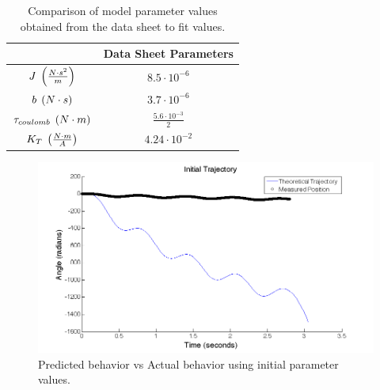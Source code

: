 \documentclass{article}
\theoremstyle{plain}
\theoremstyle{definition}
\theoremstyle{remark}
\begin{document}
\begin{table}
\begin{center}
    \begin{tabular}{|c|c|}
        \hline
        ~                                                      & Data Sheet Parameters        \\ \hline
        $J \hspace{0.1cm} \left( \frac{N\cdot s^2}{m} \right)$     & $8.5 \cdot 10^{-6} $               \\ 
        $b \hspace{0.1cm} \left( N \cdot s \right) $               & $3.7\cdot 10^{-6} $                 \\ 
        $\tau_{coulomb} \hspace{0.1cm} \left( N \cdot m \right)$           & $\frac{5.6 \cdot 10^{-3}}{2} $  \\ 
        $K_{T} \hspace{0.1cm} \left( \frac{N\cdot m}{A} \right) $ & $4.24 \cdot 10^{-2}$             \\
        \hline
    \end{tabular}
\caption{Comparison of model parameter values obtained from the data sheet to fit values.}
\label{q2_b1}
\end{center}
\end{table}

\begin{figure}
\begin{center}
\includegraphics[width = 14cm]{initialModel.png}
\caption{Predicted behavior vs Actual behavior using initial parameter values.}
\label{q2_b2}
\end{center}
\end{figure}
\end{document}
